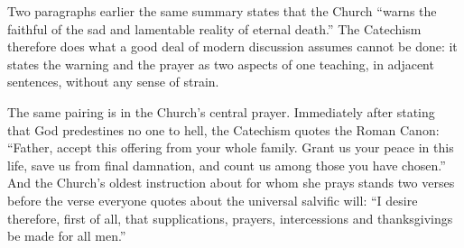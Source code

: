 Two paragraphs earlier the same summary states that the Church ``warns the faithful of the sad and lamentable reality of eternal death.'' The Catechism therefore does what a good deal of modern discussion assumes cannot be done: it states the warning and the prayer as two aspects of one teaching, in adjacent sentences, without any sense of strain.

The same pairing is in the Church's central prayer. Immediately after stating that God predestines no one to hell, the Catechism quotes the Roman Canon: ``Father, accept this offering from your whole family. Grant us your peace in this life, save us from final damnation, and count us among those you have chosen.'' And the Church's oldest instruction about for whom she prays stands two verses before the verse everyone quotes about the universal salvific will: ``I desire therefore, first of all, that supplications, prayers, intercessions and thanksgivings be made for all men.''

